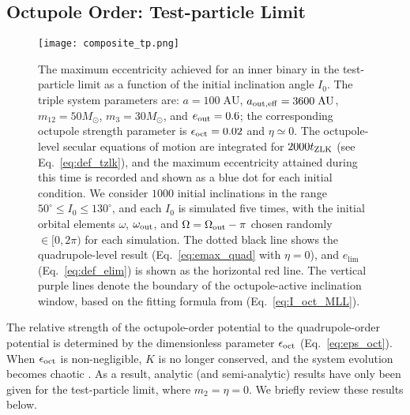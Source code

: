\documentclass[
        fleqn,
        usenatbib,
    ]{mnras}
\begin{document}
\subsection{Octupole Order: Test-particle Limit}\label{ss:oct_tp}

\begin{figure}
    \centering
    \texttt{[image: composite\_tp.png]}
    \caption{The maximum eccentricity achieved for an inner binary in the
    test-particle limit as a function of the initial inclination angle $I_0$.
    The triple system parameters are: $a = 100\;\mathrm{AU}$, $a_{\rm out, eff}
    = 3600\;\mathrm{AU}$, $m_{12} = 50M_{\odot}$, $m_3 = 30M_{\odot}$, and
    $e_{\rm out} = 0.6$; the corresponding octupole strength parameter is
    $\epsilon_{\rm oct} = 0.02$ and $\eta \simeq 0$. The octupole-level secular
    equations of motion are integrated for $2000t_{\rm ZLK}$ (see
    Eq.~\ref{eq:def_tzlk}), and the maximum eccentricity attained during this
    time is recorded and shown as a blue dot for each initial condition. We
    consider $1000$ initial inclinations in the range $50^\circ \leq I_0 \leq
    130^\circ$, and each $I_0$ is simulated five times, with the initial orbital
    elements $\omega$, $\omega_{\rm out}$, and $\Omega = \Omega_{\rm out} - \pi$
    chosen randomly $\in [0, 2\pi)$ %
    for each simulation. The dotted black line shows the quadrupole-level result
    (Eq.~\ref{eq:emax_quad} with $\eta = 0$), and $e_{\lim}$
    (Eq.~\ref{eq:def_elim}) is shown as the horizontal red line. The vertical
    purple lines denote the boundary of the octupole-active inclination window,
    based on the fitting formula from \citet{MLL16} (Eq.~\ref{eq:I_oct_MLL}).
    }\label{fig:composite_tp}
\end{figure}

The relative strength of the octupole-order potential to the quadrupole-order
potential is determined by the dimensionless parameter $\epsilon_{\rm oct}$
(Eq.~\ref{eq:eps_oct}). When $\epsilon_{\rm oct}$ is non-negligible, $K$ is no
longer conserved, and the system evolution becomes chaotic
\citep{ford2000secular, katz2011long, lithwick2011eccentric, li2014chaos,
LML15}. As a result, analytic (and semi-analytic) results have only been given
for the test-particle limit, where $m_2 = \eta = 0$. We briefly review these
results below.
\end{document}
